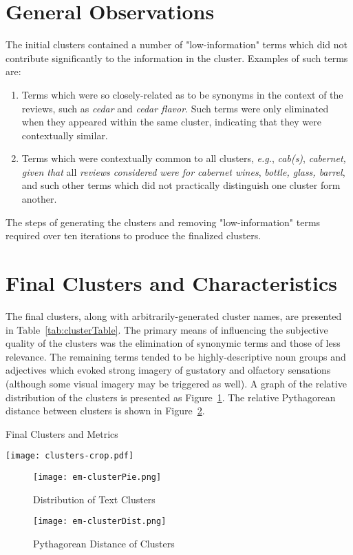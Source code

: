\documentclass[12pt]{article}
\begin{document}
\section{General Observations}
The initial clusters contained a number of "low-information" terms which did not contribute significantly to the information in the cluster. Examples of such terms are:
\begin{enumerate}
\item Terms which were so closely-related as to be synonyms in the context of the reviews, such as \textit{cedar} and \textit{cedar flavor}. Such terms were only eliminated when they appeared within the same cluster, indicating that they were contextually similar.
\item Terms which were contextually common to all clusters, \textit{e.g.}, \textit{cab(s)}, \textit{cabernet, given that} all \textit{reviews considered were for cabernet wines}, \textit{bottle, glass, barrel}, and such other terms which did not practically distinguish one cluster form another. 
\end{enumerate}
The steps of generating the clusters and removing "low-information" terms required over ten iterations to produce the finalized clusters.

\section{Final Clusters and Characteristics}
The final clusters, along with arbitrarily-generated cluster names, are presented in Table~\ref{tab:clusterTable}. The primary means of influencing the subjective quality of the clusters was the elimination of synonymic terms and those of less relevance. The remaining terms tended to be highly-descriptive noun groups and adjectives which evoked strong imagery of gustatory and olfactory sensations (although some visual imagery may be triggered as well). A graph of the relative distribution of the clusters is presented as Figure~\ref{fig:textPie}. The relative Pythagorean distance between clusters is shown in Figure~\ref{fig:textDist}.

\begin{table}[H]
	\begin{center}
	\label{tab:clusterTable}
	\caption{Final Clusters and Metrics}
	\texttt{[image: clusters-crop.pdf]}
	\end{center}
\end{table}

\begin{figure}
	\texttt{[image: em-clusterPie.png]}
	\caption{Distribution of Text Clusters}
	\label{fig:textPie}
\end{figure}
\begin{figure}[H]
	\texttt{[image: em-clusterDist.png]}
	\caption{Pythagorean Distance of Clusters}
	\label{fig:textDist}
\end{figure}
\end{document}
